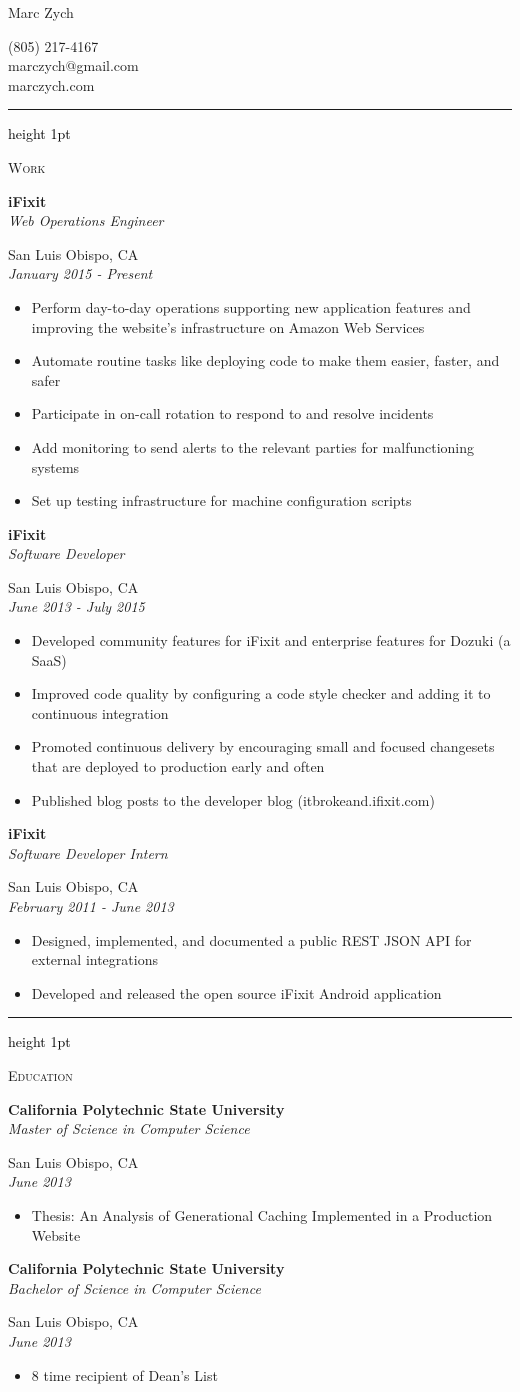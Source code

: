 \documentclass[letterpaper,10pt]{article}
\newcommand{\resauthor}[4]{
   \begin{minipage}[c]{.4\textwidth}
      \raggedright
      {\Huge #1}
   \end{minipage}
   \hfill
   \begin{minipage}[c]{.4\textwidth}
      \raggedleft
      #2\\
      #3\\
      #4
   \end{minipage}
}
\newcommand{\ressectiondivider}{
   \textcolor{black}{\hrule height 1pt}
}
\newcommand{\resitem}[1]{\item #1 \vspace{-2pt}}
\newcommand{\ressubheading}[4]{
   \begin{minipage}[t]{10cm}
      \flushleft
      \large{\textbf{#1}}\\
      \normalsize{\textit{#3}}\\
   \end{minipage}
   \hfill
   \begin{minipage}[t]{5cm}
      \flushright
      #2\\
      \textit{#4}\\
   \end{minipage}
}
\newenvironment{ressection}[1]{
   \vspace{12pt}
   \ressectiondivider
   \vspace{5pt}
   \begin{minipage}[t]{2.75cm}
      \flushleft
      \Large{\textrm{\textsc{#1}}}
   \end{minipage}
   \hfill
   \begin{minipage}[t]{16cm}
      \flushleft
}{
   \end{minipage}
}
\begin{document}
\resauthor{Marc Zych}{(805) 217-4167}{marczych@gmail.com}{marczych.com}

\begin{ressection}{Work}
   \ressubheading{iFixit}{San Luis Obispo, CA}{Web Operations Engineer}{January 2015 - Present}
   \begin{itemize}
      \resitem{Perform day-to-day operations supporting new application features and improving the website's infrastructure on Amazon Web Services}
      \resitem{Automate routine tasks like deploying code to make them easier, faster, and safer}
      \resitem{Participate in on-call rotation to respond to and resolve incidents}
      \resitem{Add monitoring to send alerts to the relevant parties for malfunctioning systems}
      \resitem{Set up testing infrastructure for machine configuration scripts}
   \end{itemize}
   \ressubheading{iFixit}{San Luis Obispo, CA}{Software Developer}{June 2013 - July 2015}
   \begin{itemize}
      \resitem{Developed community features for iFixit and enterprise features for Dozuki (a SaaS)}
      \resitem{Improved code quality by configuring a code style checker and adding it to continuous integration}
      \resitem{Promoted continuous delivery by encouraging small and focused changesets that are deployed to production early and often}
      \resitem{Published blog posts to the developer blog (itbrokeand.ifixit.com)}
   \end{itemize}
   \ressubheading{iFixit}{San Luis Obispo, CA}{Software Developer Intern}{February 2011 - June 2013}
   \begin{itemize}
      \resitem{Designed, implemented, and documented a public REST JSON API for external integrations}
      \resitem{Developed and released the open source iFixit Android application}
   \end{itemize}
\end{ressection}

\begin{ressection}{Education}
   \ressubheading{California Polytechnic State University}{San Luis Obispo, CA}{Master of Science in Computer Science}{June 2013}
   \begin{itemize}
      \resitem{Thesis: An Analysis of Generational Caching Implemented in a Production Website}
   \end{itemize}
   \ressubheading{California Polytechnic State University}{San Luis Obispo, CA}{Bachelor of Science in Computer Science}{June 2013}
   \begin{itemize}
      \resitem{8 time recipient of Dean's List}
   \end{itemize}
\end{ressection}
\end{document}
